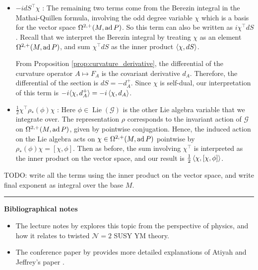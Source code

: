\begin{itemize}[leftmargin=\parindent]
	\item 
$-idS^\intercal \chi$ : The remaining two terms come from the Berezin integral
in the Mathai-Quillen formula, involving the odd degree
variable $\chi$ which is a basis for the vector space $\Omega^{2,+}(M,\operatorname{ad} P)$.
So this term can also be written as $i \chi^{\intercal} dS$.
Recall that we interpret the Berezin integral by treating $\chi$ as an element 
$\Omega^{2,+}(M,\operatorname{ad} P)$, and 
sum $\chi^\intercal dS$ as the inner product $\gen{\chi,dS}$.

From Proposition \ref{prop:curvature_derivative}, the
differential of the curvature operator $A \mapsto F_A$ is the covariant
derivative  $d_A$. Therefore, the differential of the section is $dS = -d_A^+$.
Since $\chi$ is self-dual, our interpretation of this term is $-i\gen[*]{\chi,d_A^+} =
-i\gen{\chi,d_A}$.

	\item 
$\frac{1}{2}\chi^\intercal \rho_*(\phi)\chi$ :
Here $\phi \in \operatorname{Lie}(\mathcal{G})$ is the other Lie algebra 
variable that we integrate over. The representation $\rho$ corresponds to the
invariant action of $\mathcal{G}$ on $\Omega^{2,+}(M,\operatorname{ad} P)$, given by pointwise
conjugation. Hence, the induced action on the Lie algebra acts on $\chi\in
\Omega^{2,+}(M,\operatorname{ad} P)$ pointwise by $\rho_*(\phi) \chi = [\chi,\phi]$. 
Then as before, the sum involving  $\chi^\intercal$ is interpreted as the inner
product on the vector space, and our result is  $\frac{1}{2} \gen{\chi,
[\chi,\phi]}$. 


\end{itemize}

TODO: write all the terms using the inner product on the vector space, and write
final exponent as integral over the base $M$. 

\vspace{5mm}
\hrule 
\vspace{5mm}

\textbf{Bibliographical notes}
{\small
\begin{itemize}
	\item The lecture notes by \citet{cordes95} explores this topic from the
	perspective of physics, and how it relates to twisted 
	$\mathcal{N}=2$ SUSY YM theory.
	\item The conference paper by \citet{naber} provides more detailed
	explanations of Atiyah and Jeffrey's paper \cite{atiyahlagrangians}.
\end{itemize}
}



